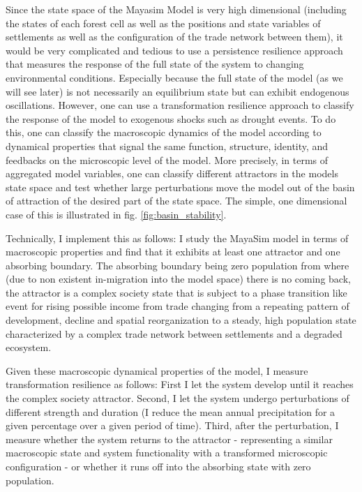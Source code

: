 Since the state space of the Mayasim Model is very high dimensional (including the states of each forest cell as well as the positions and state variables of settlements as well as the configuration of the trade network between them), it would be very complicated and tedious to use a persistence resilience approach that measures the response of the full state of the system to changing environmental conditions. Especially because the full state of the model (as we will see later) is not necessarily an equilibrium state but can exhibit endogenous oscillations.
However, one can use a transformation resilience approach to classify the response of the model to exogenous shocks such as drought events.
To do this, one can classify the macroscopic dynamics of the model according to dynamical properties that signal the same function, structure, identity, and feedbacks on the microscopic level of the model. More precisely, in terms of aggregated model variables, one can classify different attractors in the models state space and test whether large perturbations move the model out of the basin of attraction of the desired part of the state space. The simple, one dimensional case of this is illustrated in fig. \ref{fig:basin_stability}.

Technically, I implement this as follows:
I study the MayaSim model in terms of macroscopic properties and find that it exhibits at least one attractor and one absorbing boundary. The absorbing boundary being zero population from where (due to non existent in-migration into the model space) there is no coming back, the attractor is a complex society state that is subject to a phase transition like event for rising possible income from trade changing from a repeating pattern of development, decline and spatial reorganization to a steady, high population state characterized by a complex trade network between settlements and a degraded ecosystem.

Given these macroscopic dynamical properties of the model, I measure transformation resilience as follows: First I let the system develop until it reaches the complex society attractor. Second, I let the system undergo perturbations of different strength and duration (I reduce the mean annual precipitation for a given percentage over a given period of time). Third, after the perturbation, I measure whether the system returns to the attractor - representing a similar macroscopic state and system functionality with a transformed microscopic configuration - or whether it runs off into the absorbing state with zero population.

